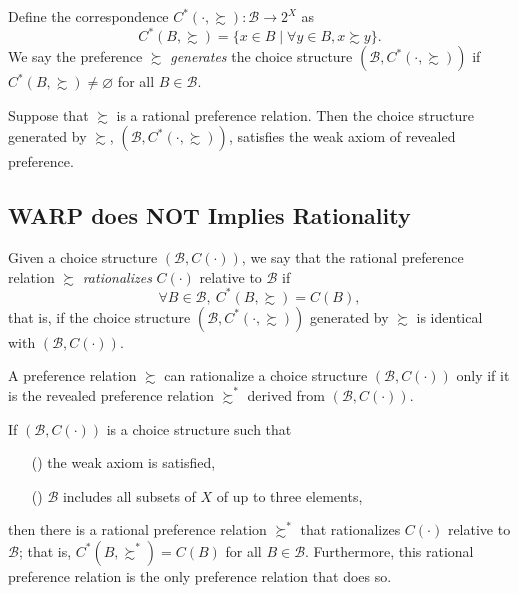 \documentclass[12pt,fleqn]{book} %
\begin{document}
\begin{definition}
	Define the correspondence $C^*(\cdot,\succsim):\mathcal{B}\rightarrow 2^X$ as 
	\[
	C^*(B,\succsim)=\{x\in B\;|\;\forall y\in B, x\succsim y\}.
	\]
	We say the preference $\succsim$ \emph{generates} the choice structure $(\mathcal{B},C^*(\cdot,\succsim))$ if $C^*(B,\succsim)\ne\varnothing$ for all $B\in\mathcal{B}$.	
\end{definition}

\begin{proposition}
	Suppose that $\succsim$ is a rational preference relation. Then the choice structure generated by $\succsim$, $(\mathcal{B},C^*(\cdot,\succsim))$, satisfies the weak axiom of revealed preference. 
\end{proposition}

\subsection{WARP does NOT Implies Rationality}
\vspace{4pt}
\begin{definition}[Rationalization]
	Given a choice structure $(\mathcal{B},C(\cdot))$, we say that the rational preference relation $\succsim$ \emph{rationalizes} $C(\cdot)$ relative to $\mathcal{B}$ if
	\[
	\forall B\in\mathcal{B},\ C^*(B,\succsim)=C(B),
	\]
	that is, if the choice structure $(\mathcal{B},C^*(\cdot,\succsim))$ generated by $\succsim$ is identical with $(\mathcal{B},C(\cdot))$.
\end{definition}

A preference relation  $\succsim$ can rationalize a choice structure $(\mathcal{B},C(\cdot))$ only if it is the revealed preference relation $\succsim^*$ derived from $(\mathcal{B},C(\cdot))$.

\begin{proposition}
	If $(\mathcal{B},C(\cdot))$ is a choice structure such that
	\begin{enumerate}
		\item[(\romannumeral1)] the  weak axiom is satisfied,
		\item[(\romannumeral2)] $\mathcal{B}$ includes all subsets of $X$ of up to three elements,
	\end{enumerate}
	then there is a rational preference relation $\succsim^*$ that rationalizes $C(\cdot)$ relative to $\mathcal{B}$; that is, $C^*(B,\succsim^*)=C(B)$ for all $B\in\mathcal{B}$. Furthermore, this rational preference relation is the only preference relation that does so.
\end{proposition}
\end{document}
